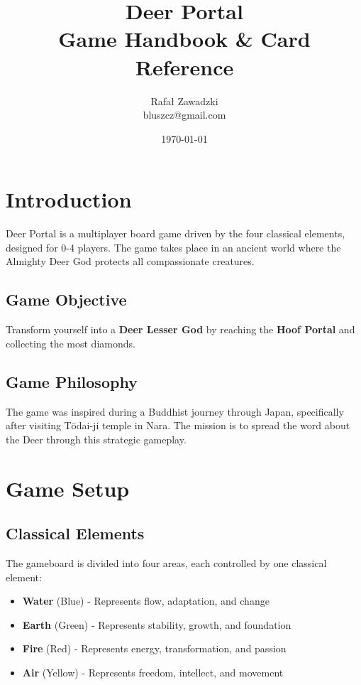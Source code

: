 \documentclass[12pt,a4paper]{article}
\title{Deer Portal \\ \large Game Handbook \& Card Reference}
\date{\today}
\author{Rafał Zawadzki \\ \small bluszcz@gmail.com}
\begin{document}
\maketitle
\newpage

\tableofcontents
\newpage

\section{Introduction}

Deer Portal is a multiplayer board game driven by the four classical elements, designed for 0-4 players. The game takes place in an ancient world where the Almighty Deer God protects all compassionate creatures.

\subsection{Game Objective}
Transform yourself into a \textbf{Deer Lesser God} by reaching the \textbf{Hoof Portal} and collecting the most diamonds.

\subsection{Game Philosophy}
The game was inspired during a Buddhist journey through Japan, specifically after visiting Tōdai-ji temple in Nara. The mission is to spread the word about the Deer through this strategic gameplay.

\section{Game Setup}

\subsection{Classical Elements}
The gameboard is divided into four areas, each controlled by one classical element:

\begin{itemize}
    \item \textcolor{waterblue}{\textbf{Water}} (Blue) - Represents flow, adaptation, and change
    \item \textcolor{earthgreen}{\textbf{Earth}} (Green) - Represents stability, growth, and foundation  
    \item \textcolor{firered}{\textbf{Fire}} (Red) - Represents energy, transformation, and passion
    \item \textcolor{airyellow}{\textbf{Air}} (Yellow) - Represents freedom, intellect, and movement
\end{itemize}
\end{document}
